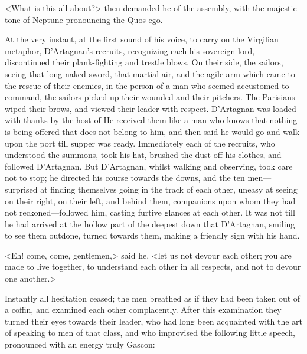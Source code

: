 <What is this all about?> then demanded he of the assembly, with the majestic tone of Neptune pronouncing the Quos ego.

At the very instant, at the first sound of his voice, to carry on the Virgilian metaphor, D'Artagnan's recruits, recognizing each his sovereign lord, discontinued their plank-fighting and trestle blows. On their side, the sailors, seeing that long naked sword, that martial air, and the agile arm which came to the rescue of their enemies, in the person of a man who seemed accustomed to command, the sailors picked up their wounded and their pitchers. The Parisians wiped their brows, and viewed their leader with respect. D'Artagnan was loaded with thanks by the host of  He received them like a man who knows that nothing is being offered that does not belong to him, and then said he would go and walk upon the port till supper was ready. Immediately each of the recruits, who understood the summons, took his hat, brushed the dust off his clothes, and followed D'Artagnan. But D'Artagnan, whilst walking and observing, took care not to stop; he directed his course towards the downs, and the ten men—surprised at finding themselves going in the track of each other, uneasy at seeing on their right, on their left, and behind them, companions upon whom they had not reckoned—followed him, casting furtive glances at each other. It was not till he had arrived at the hollow part of the deepest down that D'Artagnan, smiling to see them outdone, turned towards them, making a friendly sign with his hand.

<Eh! come, come, gentlemen,> said he, <let us not devour each other; you are made to live together, to understand each other in all respects, and not to devour one another.>

Instantly all hesitation ceased; the men breathed as if they had been taken out of a coffin, and examined each other complacently. After this examination they turned their eyes towards their leader, who had long been acquainted with the art of speaking to men of that class, and who improvised the following little speech, pronounced with an energy truly Gascon:

